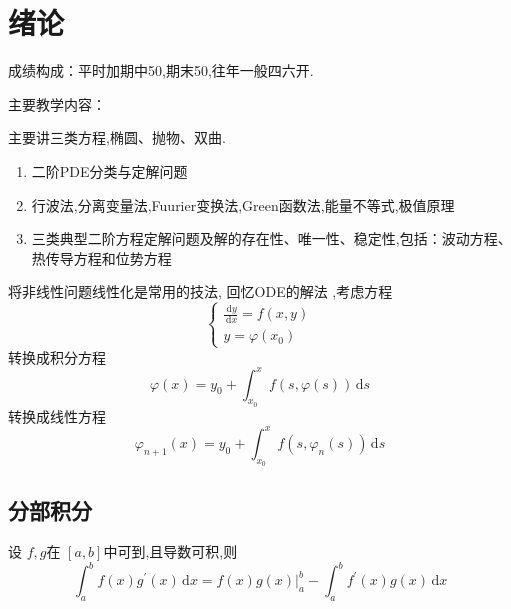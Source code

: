 \documentclass[../../PDE.tex]{subfiles}
\begin{document}
\ifSubfilesClassLoaded{
    \frontmatter

    \tableofcontents
    
    \mainmatter
}{}


\chapter{绪论}

成绩构成：平时加期中50,期末50,往年一般四六开.





\noindent 主要教学内容：

主要讲三类方程,椭圆、抛物、双曲.

\begin{enumerate}
    \item 二阶PDE分类与定解问题
    \item 行波法,分离变量法,Fuurier变换法,Green函数法,能量不等式,极值原理
    \item 三类典型二阶方程定解问题及解的存在性、唯一性、稳定性,包括：波动方程、热传导方程和位势方程
\end{enumerate}



将非线性问题线性化是常用的技法,
回忆ODE的解法
,考虑方程 \[
\begin{cases} \frac{\,\mathrm{d} y   }{\,\mathrm{d} x } =  f\left( x,y \right)\\ 
 y =   \varphi \left( x_0 \right)    \end{cases} 
\]
转换成积分方程 \[
 \varphi \left( x \right) =  y_0+ \int_{x_0}^{x}f\left( s, \varphi \left( s \right)  \right)\,\mathrm{d} s  
\]转换成线性方程 \[
 \varphi _{n+ 1 }\left( x \right)= y_0+ \int_{x_0}^{x} f\left( s, \varphi _{n}\left( s \right)  \right)\,\mathrm{d} s 
\]

\section{分部积分}

\begin{theorem}
    设 \(  f,g  \)在 \(  \left[ a,b \right]   \)中可到,且导数可积,则 \[
    \int_{a}^{b}f\left( x \right)g^{\prime} \left( x \right)\,\mathrm{d} x=  f\left( x \right)g\left( x \right)|_{a}^{b} - \int_{a}^{b}f^{\prime} \left( x \right)g\left( x \right)      \,\mathrm{d} x
    \]  
\end{theorem}
\end{document}

